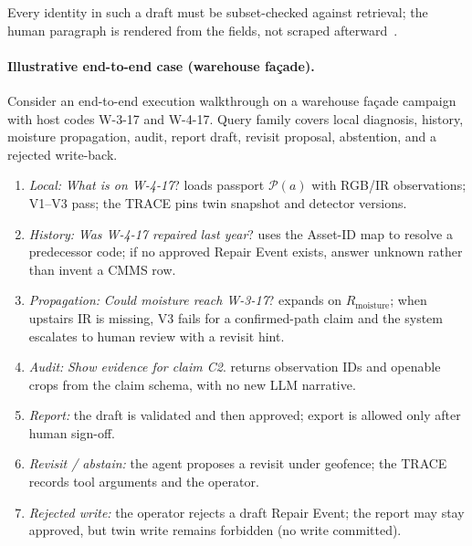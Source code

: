 Every identity in such a draft must be subset-checked against retrieval; the human paragraph is rendered from the fields, not scraped afterward~\cite{zheng2023bimassistant,joffe2025buildingcodes}.

\paragraph{Illustrative end-to-end case (warehouse façade).}
\label{par:ch8-e2e}
Consider an end-to-end execution walkthrough on a warehouse façade campaign with host codes W-3-17 and W-4-17. Query family covers local diagnosis, history, moisture propagation, audit, report draft, revisit proposal, abstention, and a rejected write-back.

\begin{enumerate}
\item \emph{Local:} \emph{What is on W-4-17}? loads passport $\mathcal{P}(a)$ with RGB/IR observations; V1--V3 pass; the TRACE pins twin snapshot and detector versions.
\item \emph{History:} \emph{Was W-4-17 repaired last year}? uses the Asset-ID map to resolve a predecessor code; if no approved Repair Event exists, answer unknown rather than invent a CMMS row.
\item \emph{Propagation:} \emph{Could moisture reach W-3-17}? expands on $R_{\mathrm{moisture}}$; when upstairs IR is missing, V3 fails for a confirmed-path claim and the system escalates to human review with a revisit hint.
\item \emph{Audit:} \emph{Show evidence for claim C2}. returns observation IDs and openable crops from the claim schema, with no new LLM narrative.
\item \emph{Report:} the draft is validated and then approved; export is allowed only after human sign-off.
\item \emph{Revisit / abstain:} the agent proposes a revisit under geofence; the TRACE records tool arguments and the operator.
\item \emph{Rejected write:} the operator rejects a draft Repair Event; the report may stay approved, but twin write remains forbidden (no write committed).
\end{enumerate}

